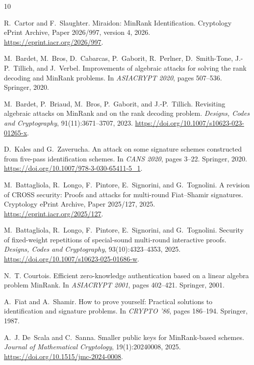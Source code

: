 \documentclass[10pt,a4paper]{article}
\begin{document}
\begin{thebibliography}{10}

R.~Cartor and F.~Slaughter.
\newblock Miraidon: MinRank Identification.
\newblock Cryptology ePrint Archive, Paper 2026/997, version 4, 2026.
\newblock \url{https://eprint.iacr.org/2026/997}.

M.~Bardet, M.~Bros, D.~Cabarcas, P.~Gaborit, R.~Perlner, D.~Smith-Tone,
  J.-P.~Tillich, and J.~Verbel.
\newblock Improvements of algebraic attacks for solving the rank decoding and
  MinRank problems.
\newblock In \emph{ASIACRYPT 2020}, pages 507--536. Springer, 2020.

M.~Bardet, P.~Briaud, M.~Bros, P.~Gaborit, and J.-P.~Tillich.
\newblock Revisiting algebraic attacks on MinRank and on the rank decoding
  problem.
\newblock \emph{Designs, Codes and Cryptography}, 91(11):3671--3707, 2023.
\newblock \url{https://doi.org/10.1007/s10623-023-01265-x}.

D.~Kales and G.~Zaverucha.
\newblock An attack on some signature schemes constructed from five-pass
  identification schemes.
\newblock In \emph{CANS 2020}, pages 3--22. Springer, 2020.
\newblock \url{https://doi.org/10.1007/978-3-030-65411-5_1}.

M.~Battagliola, R.~Longo, F.~Pintore, E.~Signorini, and G.~Tognolini.
\newblock A revision of CROSS security: Proofs and attacks for multi-round
  Fiat--Shamir signatures.
\newblock Cryptology ePrint Archive, Paper 2025/127, 2025.
\newblock \url{https://eprint.iacr.org/2025/127}.

M.~Battagliola, R.~Longo, F.~Pintore, E.~Signorini, and G.~Tognolini.
\newblock Security of fixed-weight repetitions of special-sound multi-round
  interactive proofs.
\newblock \emph{Designs, Codes and Cryptography}, 93(10):4323--4353, 2025.
\newblock \url{https://doi.org/10.1007/s10623-025-01686-w}.

N.~T. Courtois.
\newblock Efficient zero-knowledge authentication based on a linear algebra
  problem MinRank.
\newblock In \emph{ASIACRYPT 2001}, pages 402--421. Springer, 2001.

A.~Fiat and A.~Shamir.
\newblock How to prove yourself: Practical solutions to identification and
  signature problems.
\newblock In \emph{CRYPTO '86}, pages 186--194. Springer, 1987.

A.~J. De~Scala and C.~Sanna.
\newblock Smaller public keys for MinRank-based schemes.
\newblock \emph{Journal of Mathematical Cryptology}, 19(1):20240008, 2025.
\newblock \url{https://doi.org/10.1515/jmc-2024-0008}.

\end{thebibliography}
\end{document}
